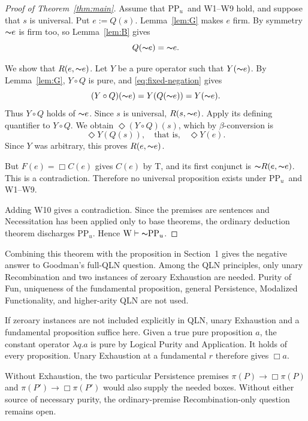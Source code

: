 \documentclass[12pt,leqno]{article}
\newcommand{\IC}{\ensuremath{\rightarrow}}
\newcommand{\NOT}{\ensuremath{\text{$\thicksim$}}}
\newcommand{\dentails}{\ensuremath{\vdash}}
\newcommand{\PPu}{\ensuremath{\mathrm{PP}_u}}
\newcommand{\W}{\ensuremath{\mathrm{W}}}
\theoremstyle{plain}
\begin{document}
\begin{proof}[Proof of Theorem~\ref{thm:main}]
Assume that \PPu\ and W1--W9 hold, and suppose that \(s\) is universal.
Put \(e:=Q(s)\). Lemma~\ref{lem:G} makes \(e\) firm.
By symmetry \(\NOT e\) is firm too, so Lemma~\ref{lem:B} gives
\begin{equation}
 Q(\NOT e)=\NOT e. \label{eq:fixed-negation}
\end{equation}

We show that \(R(e,\NOT e)\). Let \(Y\) be a pure operator such that
\(Y(\NOT e)\). By Lemma~\ref{lem:G}, \(Y\circ Q\) is pure, and
\eqref{eq:fixed-negation} gives
\[
 (Y\circ Q)(\NOT e)=Y(Q(\NOT e))=Y(\NOT e).
\]
Thus \(Y\circ Q\) holds of \(\NOT e\). Since \(s\) is universal,
\(R(s,\NOT e)\). Apply its defining quantifier to \(Y\circ Q\).
We obtain \(\Diamond(Y\circ Q)(s)\), which by \(\beta\)-conversion is
\[
 \Diamond Y(Q(s)),\quad\text{that is,}\quad \Diamond Y(e).
\]
Since \(Y\) was arbitrary, this proves \(R(e,\NOT e)\).

But \(F(e)=\Box C(e)\) gives \(C(e)\) by T, and its first conjunct is
\(\NOT R(e,\NOT e)\). This is a contradiction. Therefore no universal
proposition exists under \PPu\ and W1--W9.

Adding W10 gives a contradiction. Since the premises are sentences and
Necessitation has been applied only to base theorems, the ordinary
deduction theorem discharges \PPu. Hence \(\W\dentails\NOT\PPu\).
\end{proof}

Combining this theorem with the proposition in Section~1 gives the
negative answer to Goodman's full-QLN question. Among the QLN principles,
only unary Recombination and two instances of zeroary Exhaustion are needed.
Purity of Fun,
uniqueness of the fundamental proposition, general Persistence, Modalized
Functionality, and higher-arity QLN are not used.

If zeroary instances are not included explicitly in QLN, unary Exhaustion
and a fundamental proposition suffice here. Given a true pure proposition
\(a\), the constant operator \(\lambda q.a\) is pure by Logical Purity and
Application. It holds of every proposition. Unary Exhaustion at a
fundamental \(r\) therefore gives \(\Box a\).

Without Exhaustion, the two particular Persistence premises
\(\pi(P)\IC\Box\pi(P)\) and \(\pi(P')\IC\Box\pi(P')\) would also supply
the needed boxes. Without either source of necessary purity, the
ordinary-premise Recombination-only question remains open.
\end{document}
